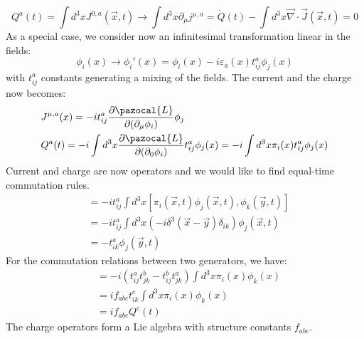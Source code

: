 \documentclass[../main.tex]{subfiles}
\begin{document}
\[
Q^a(t)=\int d^3xJ^{0,a}(\Vec{x},t)\to\int d^3x\partial_\mu j^{\mu,a}=\Dot{Q}(t)-\int d^3x\Vec{\nabla}\cdot\Vec{J}(\Vec{x},t)=0
\]
As a special case, we consider now an infinitesimal transformation linear in the fields:
\[
\phi_i(x)\to\phi_i'(x)=\phi_i(x)-i\varepsilon_a(x)t_{ij}^a\phi_j(x)
\]
with $t_{ij}^a$ constants generating a mixing of the fields. The current and the charge now becomes:
\[
\begin{aligned}
&J^{\mu,a}(x)=-it_{ij}^a\frac{\partial\pazocal{L}}{\partial(\partial_\mu\phi_i)}\phi_j\\
&Q^a(t)=-i\int d^3x\frac{\partial\pazocal{L}}{\partial(\partial_0\phi_i)}t_{ij}^a\phi_j(x)=-i\int d^3x\pi_i(x)t_{ij}^a\phi_j(x)
\end{aligned}
\]
Current and charge are now operators and we would like to find equal-time commutation rules. 
\begin{align*}
[Q^a(t),\phi_k(\Vec{y},t)]&=-it_{ij}^a\int d^3x[\pi_i(\Vec{x},t)\phi_j(\Vec{x},t),\phi_k(\Vec{y},t)]\\
&=-it_{ij}^a\int d^3x\left(-i\delta^3(\Vec{x}-\Vec{y})\delta_{ik}\right)\phi_j(\Vec{x},t)\\
&=-t_{ik}^a\phi_j(\Vec{y},t)
\end{align*}
For the commutation relations between two generators, we have:
\begin{align*}
[Q^a(t),Q^b(t)]&=-i\left(t_{ij}^at_{jk}^b-t_{ij}^bt_{jk}^a\right)\int d^3x\pi_i(x)\phi_k(x)\\
&=if_{abc}t_{ik}^c\int d^3x\pi_i(x)\phi_k(x)\\
&=if_{abc}Q^c(t)
\end{align*}
The charge operators form a Lie algebra with structure constants $f_{abc}$. 
\end{document}
